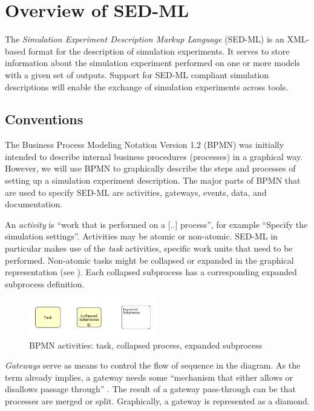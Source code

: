 \section{Overview of SED-ML}
\label{sec:overview}
The \emph{Simulation Experiment Description Markup Language} (SED-ML) is an XML-based format for the description of simulation experiments. It serves to store information about the simulation experiment performed on one or more models with a given set of outputs. Support for SED-ML compliant simulation descriptions will enable the exchange of simulation experiments across tools.
\subsection{Conventions}
%
The Business Process Modeling Notation Version 1.2 (BPMN) was initially intended to describe internal business procedures (processes) in a graphical way. However, we will use BPMN to graphically describe the steps and processes of setting up a simulation experiment description. The major parts of BPMN that are used to specify SED-ML are activities, gateways, events, data, and documentation. 

An \emph{activity} is ``work that is performed on a [..] process'', for example ``Specify the simulation settings''. Activities may be atomic or non-atomic. SED-ML in particular makes use of the \emph{task} activities, \ie specific work units that need to be performed. Non-atomic tasks might be collapsed or expanded in the graphical representation (see ). Each collapsed subprocess has a corresponding expanded subprocess definition.

\begin{figure}[h]
\centering
\includegraphics[width=0.5\textwidth]{images/processes.pdf}
\caption{BPMN activities: task, collapsed process, expanded subprocess}
\label{fig:task}
\end{figure}

\emph{Gateways} serve as means to control the flow of sequence in the diagram. As the term already implies, a gateway needs some ``mechanism that either allows or disallows passage through'' \citep{White:2004}. The result of a gateway pass-through can be that processes are merged or split. Graphically, a gateway is represented as a diamond. 

